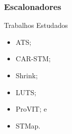 \documentclass[10pt, pdf,xcolor=pdftex,dvipsnames,table]{beamer}
\begin{document}
\begin{frame} \frametitle{Escalonadores}
    \begin{block}{Trabalhos Estudados}
        \begin{itemize}
            \item ATS;
            \item CAR-STM;
            \item Shrink;
            \item LUTS;
            \item ProVIT; e
            \item STMap.
        \end{itemize}
    \end{block}
\end{frame}

\end{document}
